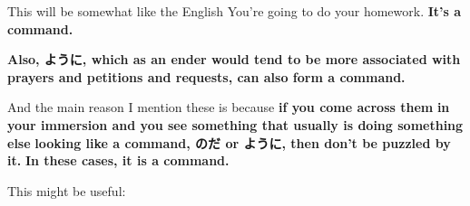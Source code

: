 {}

This will be somewhat like the English You're going to do your homework. {\bf It's a command.}

\stopsectionlevel

\startsectionlevel[title={ように},reference={ように}]

{\bf Also, ように, which as an ender would tend to be more associated with} {\bf prayers and petitions and requests, can also form a command.}

{}

\thinrule

And the main reason I mention these is because {\bf if you come across them} {\bf in your immersion and you see something that usually is doing something else} {\bf looking like a command, のだ or ように, then don't be puzzled by it.} {\bf In these cases, it is a command.}

This might be useful:

{}

{}

\stopsectionlevel

\stopsectionlevel
